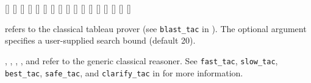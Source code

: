 \begin{isabellebody}
\begin{isamarkuptext}
  \begin{railoutput}
[]
\rail@bar
{}
[]
\rail@endbar
\rail@plus
{}
[]
\rail@endplus
\rail@end
{}
\rail@bar
{}[]
[]
[]
[]
[]
\rail@endbar
\rail@plus
{}
[]
\rail@endplus
\rail@end
{}
\rail@bar
\rail@bar
{}[]
[]
[]
\rail@endbar
\rail@bar
{}[]
[]
\rail@endbar
{}
[]
\rail@endbar
{}[]
[]
\rail@end
\end{railoutput}


  \begin{description}

  \item \hyperlink{method.blast}{\mbox{}} refers to the classical tableau prover (see
  \verb|blast_tac| in \cite{isabelle-ref}).  The optional argument
  specifies a user-supplied search bound (default 20).

  \item \hyperlink{method.fast}{\mbox{}}, \hyperlink{method.slow}{\mbox{}}, \hyperlink{method.best}{\mbox{}}, \hyperlink{method.safe}{\mbox{}}, and \hyperlink{method.clarify}{\mbox{}} refer to the generic classical
  reasoner.  See \verb|fast_tac|, \verb|slow_tac|, \verb|best_tac|, \verb|safe_tac|, and \verb|clarify_tac| in \cite{isabelle-ref} for more
  information.

  \end{description}


\end{isamarkuptext}
\end{isabellebody}
